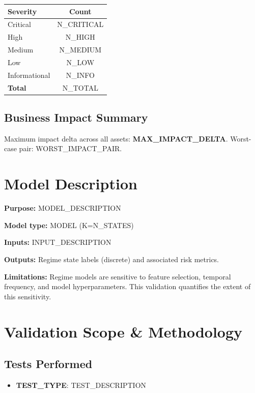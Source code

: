 \documentclass[11pt,a4paper]{article}
\begin{document}
\begin{center}
\begin{tabular}{lc}
\toprule
\textbf{Severity} & \textbf{Count} \\
\midrule
\textcolor{sevcritical}{Critical} & {{N_CRITICAL}} \\
\textcolor{sevhigh}{High}         & {{N_HIGH}} \\
\textcolor{sevmedium}{Medium}     & {{N_MEDIUM}} \\
\textcolor{sevlow}{Low}           & {{N_LOW}} \\
\textcolor{sevinfo}{Informational}& {{N_INFO}} \\
\midrule
\textbf{Total}    & {{N_TOTAL}} \\
\bottomrule
\end{tabular}
\end{center}

\subsection{Business Impact Summary}
Maximum impact delta across all assets: \textbf{{{MAX_IMPACT_DELTA}}}.
Worst-case pair: {{WORST_IMPACT_PAIR}}.

\section{Model Description}

\textbf{Purpose:} {{MODEL_DESCRIPTION}}

\textbf{Model type:} {{MODEL}} (K={{N_STATES}})

\textbf{Inputs:} {{INPUT_DESCRIPTION}}

\textbf{Outputs:} Regime state labels (discrete) and associated risk metrics.

\textbf{Limitations:} Regime models are sensitive to feature selection,
temporal frequency, and model hyperparameters. This validation quantifies
the extent of this sensitivity.

\section{Validation Scope \& Methodology}

\subsection{Tests Performed}
\begin{itemize}[leftmargin=*]
\item \textbf{{{TEST_TYPE}}}: {{TEST_DESCRIPTION}}
\end{itemize}
\end{document}
